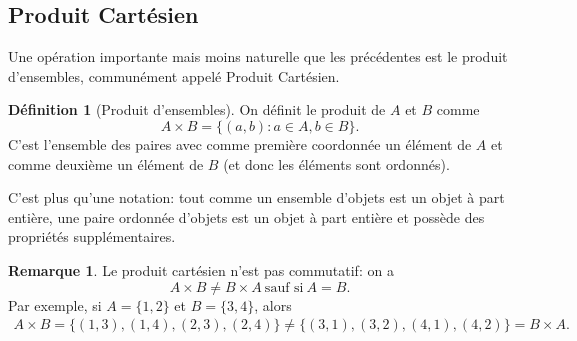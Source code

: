\documentclass[oneside,12pt,french,table]{book}
\theoremstyle{definition}
\theoremstyle{definition}
\theoremstyle{definition}
\newtheorem{definition}{Définition}[chapter]
\newtheorem*{remark}{Remarque}
\begin{document}
\subsection*{Produit Cartésien}
\noindent
Une opération importante mais moins naturelle que les précédentes est le produit d'ensembles, communément appelé Produit Cartésien.
\begin{definition}[Produit d'ensembles]
On définit le produit de $A$ et $B$ comme
\[
	A \times B=\{(a,b): a \in A, b\in B\}.
\]
C'est l'ensemble des paires avec comme première coordonnée un élément de $A$ et comme deuxième un élément de $B$ (et donc les éléments sont ordonnés).
\end{definition}
\noindent
C'est plus qu'une notation: tout comme un ensemble d'objets est un objet à part entière, une paire ordonnée d'objets est un objet à part entière et possède des propriétés supplémentaires.
\begin{remark}
Le produit cartésien n'est pas commutatif: on a 
\[
A\times B\neq B\times A \ \text{sauf si} \ A=B.
\]
Par exemple, si $A=\{1,2\}$ et $B=\{3,4\}$, alors 
\begin{align*}
	A\times B=\{(1,3),(1,4), (2,3), (2,4)\}\neq\{(3,1),(3,2),(4,1),(4,2)\} =B\times A.
\end{align*}
\end{remark}


%
\end{document}
